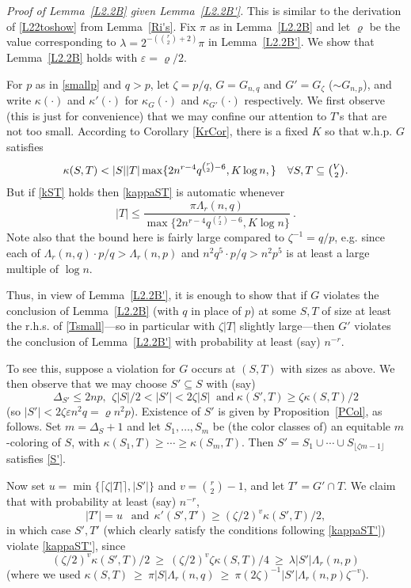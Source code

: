 \documentclass[letterpaper,11pt]{article}
\newcommand{\beq}[1]{\begin{equation}\label{#1}}
\newcommand{\enq}[0]{\end{equation}}
\newcommand{\mn}[0]{\medskip\noindent}
\newcommand{\sub}[0]{\subseteq}
\renewcommand{\dots}[0]{,\ldots,}
\newcommand{\0}[0]{\emptyset}
\newcommand{\C}[2]{{{#1}\choose{{#2}}}}
\newcommand{\Cc}[0]{\tbinom}
\newcommand{\gD}[0]{\Delta }
\newcommand{\gk}[0]{\kappa }
\newcommand{\gl}[0]{\lambda }
\newcommand{\gL}[0]{\Lambda}
\newcommand{\gz}[0]{\zeta}
\newcommand{\eps}[0]{\varepsilon }
\newcommand{\vr}[0]{\varrho}
\newcommand{\glr}[0]{\gL_r(n,p)}
\newcommand{\glq}[0]{\gL_r(n,q)}
\begin{document}
\mn
{\em Proof of Lemma~\ref{L2.2B} given Lemma~\ref{L2.2B'}.}
This is similar to the derivation of \eqref{L22toshow}
from Lemma~\ref{Ri's}.
%
Fix $\pi$ as in Lemma~\ref{L2.2B} and
let $\vr$ be the value corresponding to
$\gl =2^{-(\C{r}{2}+2)}\pi$ in Lemma~\ref{L2.2B'}.
We show that Lemma~\ref{L2.2B} holds with $\eps = \vr/2$.

For $p$ as in \eqref{smallp}
and $q>p$,  let $\gz = p/q$,
$G=G_{n,q}$ and $G'=G_\gz$ ($\sim G_{n,p}$),
and write $\kappa(\cdot)$ and $\kappa'(\cdot)$ for
$\kappa_G(\cdot)$ and $\kappa_{G'}(\cdot)$ respectively.
%
We first observe (this is just for convenience) that we may confine our attention to
$T$'s that are not too small.
%
According to Corollary \ref{KrCor},
there is a fixed $K$ so that w.h.p.
$G$ satisfies
\beq{kST}
\kappa(S,T)< |S||T|\max\{2n^{r-4}q^{\C{r}{2}-6},K\log n,\}
~~~ \forall S,T\sub \Cc{V}{2}.
\enq
%
But if \eqref{kST} holds then
\eqref{kappaST} is automatic whenever
\beq{Tsmall}
|T| \leq \frac{\pi\glq}{\max\{2n^{r-4}q^{\C{r}{2}-6},K\log n\}}~.
\enq
Note also that the bound here is fairly large
compared to $\gz^{-1}= q/p$, e.g. since each of
$\glq\cdot p/q>\glr$ and $n^2q^5\cdot p/q> n^2p^5$ is at least
a large multiple of $\log n$.




Thus, in view of Lemma~\ref{L2.2B'},
it is enough to show that if $G$ violates the conclusion of
Lemma~\ref{L2.2B} (with $q$ in place of $p$)
at some $S,T$ of size at least the r.h.s. of \eqref{Tsmall}---so in particular
with $\gz |T|$ slightly large---then $G'$
violates the conclusion of Lemma~\ref{L2.2B'}
with probability at least (say)
$n^{-r}$.

To see this, suppose a violation for $G$ occurs at $(S,T)$
with sizes as above.
We then observe that we may choose
$S'\sub S$ with (say)
%
\beq{S'}
\mbox{$\gD_{S'}\leq 2np$, $~\gz |S|/2< |S'|<2\gz |S|~$ and
$~\kappa(S',T)\geq \gz \kappa(S,T)/2$}
\enq
(so $|S'|< 2\gz \eps n^2q = \vr n^2p$).
Existence of $S'$ is given by Proposition~\ref{PCol},
as follows.
Set $m = \gD_S+1$ and
let $S_1\dots S_m$ be (the color classes of) an
equitable $m$-coloring of $S$, with
$\kappa(S_1,T)\geq \cdots \geq\kappa(S_m,T)$.
Then
$S' = S_1\cup\cdots \cup S_{\lfloor \gz m-1\rfloor}$ satisfies \eqref{S'}.



Now set
$u= \min\{\lceil \gz |T|\rceil, |S'|\}$ and
$v=\C{r}{2}-1$,
and let $T'=G'\cap T$.
We claim that with probability at least (say) $n^{-r}$,
\beq{T'gz}
\mbox{$|T'|=u~~$ and
$~~\kappa'(S',T')\geq (\gz/2)^v\kappa (S',T)/2,
$}
\enq
in which case $S',T'$ (which clearly satisfy the conditions
following \eqref{kappaST'}) violate \eqref{kappaST'},
since
\[
(\gz/2)^v\kappa (S',T)/2
~\geq ~(\gz/2)^v\gz\kappa (S,T)/4
~\geq ~\gl|S'|\glr
\]
(where we used
$
\gk(S,T)~\geq ~\pi |S|\glq
~\geq ~ \pi (2\gz)^{-1}|S'|\glr \gz^{-v}
$).
\end{document}
